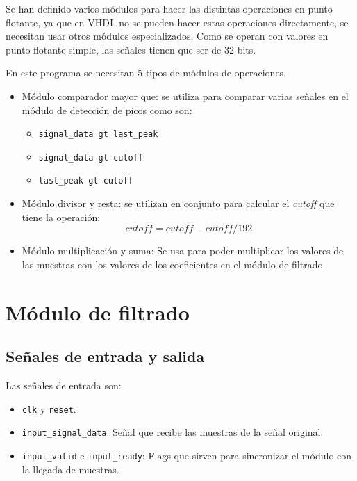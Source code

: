 Se han definido varios módulos para hacer las distintas operaciones en punto flotante, ya que en VHDL no se pueden hacer estas operaciones directamente, se necesitan usar otros módulos especializados. Como se operan con valores en punto flotante simple, las señales tienen que ser de 32 bits.

En este programa se necesitan 5 tipos de módulos de operaciones.

\begin{itemize}
    \item Módulo comparador mayor que: se utiliza para comparar varias señales en el módulo de detección de picos como son:
    \begin{itemize}
        \item \texttt{signal\_data gt last\_peak}
        \item \texttt{signal\_data gt cutoff}
        \item \texttt{last\_peak gt cutoff}
    \end{itemize}

    \item Módulo divisor y resta: se utilizan en conjunto para calcular el \textit{cutoff} que tiene la operación:
    \[cutoff = cutoff - cutoff/192\]

    \item Módulo multiplicación y suma: Se usa para poder multiplicar los valores de las muestras con los valores de los coeficientes en el módulo de filtrado.
    
\end{itemize}

\section{Módulo de filtrado}

\subsection{Señales de entrada y salida}

Las señales de entrada son:

\begin{itemize}
\item \texttt{clk} y \texttt{reset}.
\item \texttt{input\_signal\_data}: Señal que recibe las muestras de la señal original.
\item \texttt{input\_valid} e \texttt{input\_ready}: Flags que sirven para sincronizar el módulo con la llegada de muestras. 
\end{itemize}


